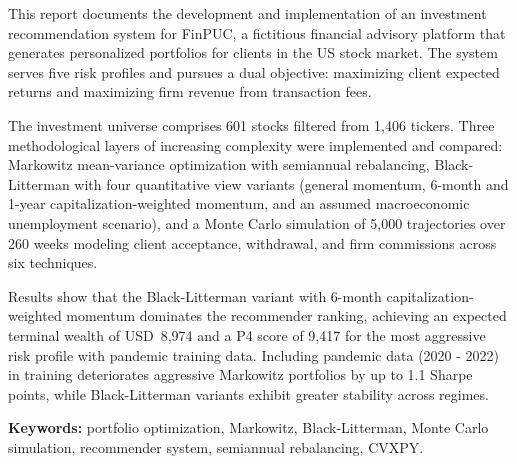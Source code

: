 This report documents the development and implementation of an investment
recommendation system for FinPUC, a fictitious financial advisory platform
that generates personalized portfolios for clients in the US stock market.
The system serves five risk profiles and pursues a dual objective: maximizing
client expected returns and maximizing firm revenue from transaction fees.

The investment universe comprises 601 stocks filtered from 1,406 tickers.
Three methodological layers of increasing complexity were implemented and
compared: Markowitz mean-variance optimization with semiannual rebalancing,
Black-Litterman with four quantitative view variants (general momentum,
6-month and 1-year capitalization-weighted momentum, and an assumed
macroeconomic unemployment scenario), and a Monte Carlo simulation of 5,000
trajectories over 260 weeks modeling client acceptance, withdrawal, and firm
commissions across six techniques.

Results show that the Black-Litterman variant with 6-month
capitalization-weighted momentum dominates the recommender ranking, achieving
an expected terminal wealth of USD~8,974 and a P4 score of 9,417 for the
most aggressive risk profile with pandemic training data. Including
pandemic data (2020 - 2022) in training deteriorates aggressive Markowitz
portfolios by up to 1.1 Sharpe points, while Black-Litterman variants
exhibit greater stability across regimes.

\textbf{Keywords:} portfolio optimization, Markowitz, Black-Litterman, Monte
Carlo simulation, recommender system, semiannual rebalancing, CVXPY.
